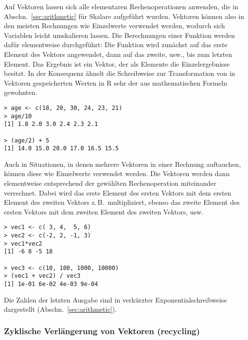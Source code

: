 Auf Vektoren lassen sich alle elementaren Rechenoperationen anwenden, die in Abschn.\ \ref{sec:arithmetic} für Skalare aufgeführt wurden. Vektoren können also in den meisten Rechnungen wie Einzelwerte verwendet werden, wodurch sich Variablen leicht umskalieren lassen. Die Berechnungen einer Funktion werden dafür elementweise durchgeführt: Die Funktion wird zunächst auf das erste Element des Vektors angewendet, dann auf das zweite, usw., bis zum letzten Element. Das Ergebnis ist ein Vektor, der als Elemente die Einzelergebnisse besitzt. In der Konsequenz ähnelt die Schreibweise zur Transformation von in Vektoren gespeicherten Werten in R sehr der aus mathematischen Formeln gewohnten.
\begin{lstlisting}
> age <- c(18, 20, 30, 24, 23, 21)
> age/10
[1] 1.8 2.0 3.0 2.4 2.3 2.1

> (age/2) + 5
[1] 14.0 15.0 20.0 17.0 16.5 15.5
\end{lstlisting}

Auch in Situationen, in denen mehrere Vektoren in einer Rechnung auftauchen, können diese wie Einzelwerte verwendet werden. Die Vektoren werden dann elementweise entsprechend der gewählten Rechenoperation miteinander verrechnet. Dabei wird das erste Element des ersten Vektors mit dem ersten Element des zweiten Vektors z.\,B.\ multipliziert, ebenso das zweite Element des ersten Vektors mit dem zweiten Element des zweiten Vektors, usw.
\begin{lstlisting}
> vec1 <- c( 3, 4,  5, 6)
> vec2 <- c(-2, 2, -1, 3)
> vec1*vec2
[1] -6 8 -5 18

> vec3 <- c(10, 100, 1000, 10000)
> (vec1 + vec2) / vec3
[1] 1e-01 6e-02 4e-03 9e-04
\end{lstlisting}

Die Zahlen der letzten Ausgabe sind in verkürzter Exponentialschreibweise dargestellt (Abschn.\ \ref{sec:arithmetic}).

\subsubsection{Zyklische Verlängerung von Vektoren (recycling)}
\label{sec:recycling}

